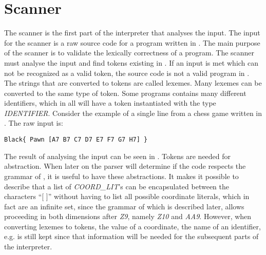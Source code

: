 \section{Scanner}
The scanner is the first part of the interpreter that analyses the input. The input for the scanner is a raw source code for a program written in \productname{}. The main purpose of the scanner is to validate the lexically correctness of a \productname{} program. The scanner must analyse the input and find tokens existing in \productname{}. If an input is met which can not be recognized as a valid token, the source code is not a valid program in \productname{}. The strings that are converted to tokens are called lexemes. Many lexemes can be converted to the same type of token. Some programs contains many different identifiers, which in \productname{} all will have a token instantiated with the type \textit{IDENTIFIER}. Consider the example of a single line from a chess game written in \productname{}. The raw input is:
\begin{lstlisting}
Black{ Pawn [A7 B7 C7 D7 E7 F7 G7 H7] }
\end{lstlisting}
The result of analysing the input can be seen in . Tokens are needed for abstraction. When later on the parser will determine if the code respects the grammar of \productname{}, it is useful to have these abstractions. It makes it possible to describe that a list of \textit{COORD\_LIT}'s can be encapsulated between the characters ``[ ]'' without having to list all possible coordinate literals, which in fact are an infinite set, since the grammar of \productname{} which is described later, allows proceeding in both dimensions after \textit{Z9}, namely \textit{Z10} and \textit{AA9}. However, when converting lexemes to tokens, the value of a coordinate, the name of an identifier, e.g. is still kept since that information will be needed for the subsequent parts of the interpreter.


